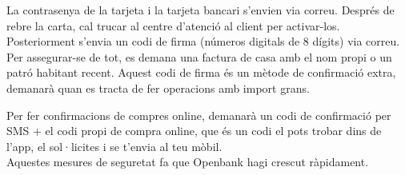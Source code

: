 La contrasenya de la tarjeta i la tarjeta bancari s'envien via correu. Després de rebre la carta, cal trucar al centre d'atenció al client per activar-los. Posteriorment s'envia un codi de firma (números digitals de 8 dígits) via correu. Per assegurar-se de tot, es demana una factura de casa amb el nom propi o un patró habitant recent. Aquest codi de firma és un mètode de confirmació extra, demanarà quan es tracta de fer operacions amb import grans.

Per fer confirmacions de compres online, demanarà un codi de confirmació per SMS + el codi propi de compra online, que és un codi el pots trobar dins de l'app, el sol·licites i se t'envia al teu mòbil. \\

Aquestes mesures de seguretat fa que Openbank hagi crescut ràpidament.



